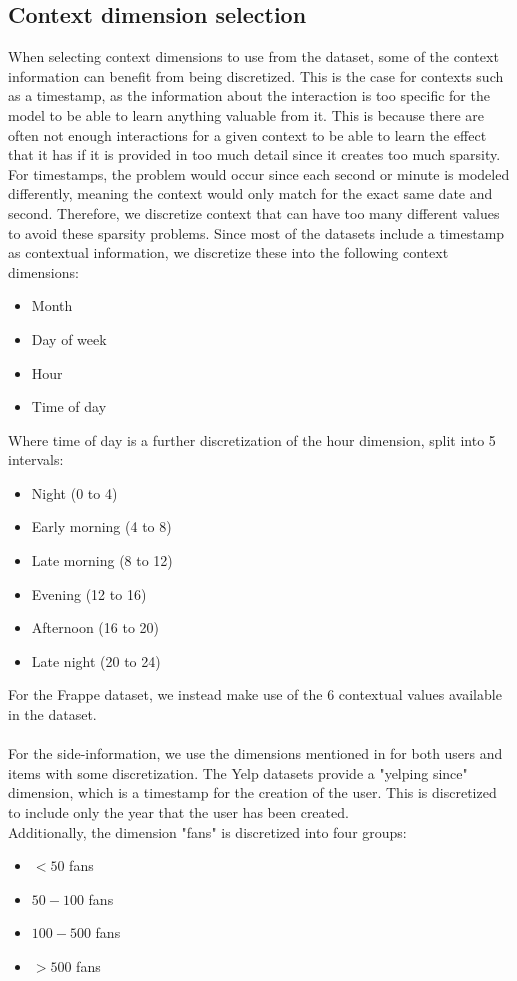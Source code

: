 \subsection{Context dimension selection}
When selecting context dimensions to use from the dataset, some of the context information can benefit from being discretized.
This is the case for contexts such as a timestamp, as the information about the interaction is too specific for the model to be able to learn anything valuable from it.
This is because there are often not enough interactions for a given context to be able to learn the effect that it has if it is provided in too much detail since it creates too much sparsity. 	 
For timestamps, the problem would occur since each second or minute is modeled differently, meaning the context would only match for the exact same date and second.
Therefore, we discretize context that can have too many different values to avoid these sparsity problems.
Since most of the datasets include a timestamp as contextual information, we discretize these into the following context dimensions:
\begin{itemize}
    \item Month
    \item Day of week
    \item Hour
    \item Time of day
\end{itemize}
Where time of day is a further discretization of the hour dimension, split into 5 intervals:
\begin{itemize}
    \item Night (0 to 4)
    \item Early morning (4 to 8)
    \item Late morning (8 to 12)
    \item Evening (12 to 16)
    \item Afternoon (16 to 20)
    \item Late night (20 to 24)
\end{itemize}
For the Frappe dataset, we instead make use of the 6 contextual values available in the dataset.
\\\\
For the side-information, we use the dimensions mentioned in  for both users and items with some discretization.
The Yelp datasets provide a "yelping since" dimension, which is a timestamp for the creation of the user.
This is discretized to include only the year that the user has been created.
\\
Additionally, the dimension "fans" is discretized into four groups:
\begin{itemize}
    \item $< 50$ fans
    \item $50 - 100$ fans
    \item $100-500$ fans
    \item $> 500$ fans
\end{itemize}


